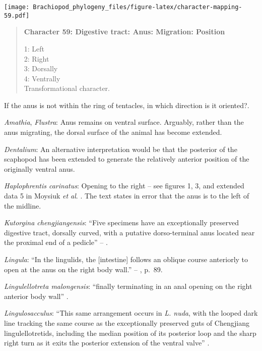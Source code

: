 \documentclass[openany]{book}
\theoremstyle{definition}
\theoremstyle{definition}
\theoremstyle{definition}
\theoremstyle{remark}
\begin{document}
\texttt{[image: Brachiopod\_phylogeny\_files/figure-latex/character-mapping-59.pdf]}

\begin{quote}
\textbf{Character 59: Digestive tract: Anus: Migration: Position}

1: Left\\
2: Right\\
3: Dorsally\\
4: Ventrally\\
Transformational character.
\end{quote}

If the anus is not within the ring of tentacles, in which direction is
it oriented?.

\hypertarget{Amathia-coding-59}{}
\emph{Amathia}, \emph{Flustra}: Anus remains on ventral surface.
Arguably, rather than the anus migrating, the dorsal surface of the
animal has become extended.

\hypertarget{Dentalium-coding-59}{}
\emph{Dentalium}: An alternative interpretation would be that the
posterior of the scaphopod has been extended to generate the relatively
anterior position of the originally ventral anus.

\hypertarget{Haplophrentis_carinatus-coding-59}{}
\emph{Haplophrentis carinatus}: Opening to the right -- see figures 1,
3, and extended data 5 in Moysiuk \emph{et al}.
\citeyearpar{Moysiuk2017Hyolithsare}. The text states in error that the
anus is to the left of the midline.

\hypertarget{Kutorgina_chengjiangensis-coding-59}{}
\emph{Kutorgina chengjiangensis}: ``Five specimens have an exceptionally
preserved digestive tract, dorsally curved, with a putative
dorso-terminal anus located near the proximal end of a pedicle'' --
\citet{Zhang2007Rhynchonelliformeanbrachiopods}.

\hypertarget{Lingula-coding-59}{}
\emph{Lingula}: ``In the lingulids, the {[}intestine{]} follows an
oblique course anteriorly to open at the anus on the right body wall.''
-- \citet{Williams1997Introduction}, p.~89.

\hypertarget{Lingulellotreta_malongensis-coding-59}{}
\emph{Lingulellotreta malongensis}: ``finally terminating in an anal
opening on the right anterior body wall'' \citep[p.66]{Zhang2007Noteon}.

\hypertarget{Lingulosacculus-coding-59}{}
\emph{Lingulosacculus}: ``This same arrangement occurs in \emph{L.
nuda}, with the looped dark line tracking the same course as the
exceptionally preserved guts of Chengjiang lingulellotretids, including
the median position of its posterior loop and the sharp right turn as it
exits the posterior extension of the ventral valve''
\citep[p.310]{Balthasar2009EarlyCambrian}.
\end{document}
